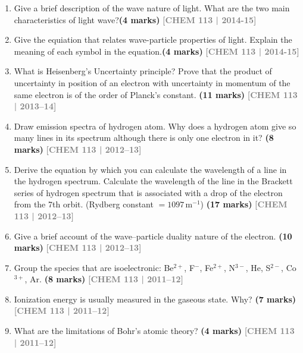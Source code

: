 \documentclass[12pt,a3paper]{article}
\newcommand{\yr}[1]{\hfill\textcolor{gray}{\small\textbf{[#1]}}}
\newcommand{\mk}[1]{\textcolor{orange!70!black}{\small\textbf{(#1 marks)}}}
\begin{document}
\begin{enumerate}
\item Give a brief description of the wave nature of light. What are the two main characteristics of light wave?\mk{4}
\yr{CHEM 113 | 2014-15}



\item Give the equiation that relates wave-particle properties of light. Explain the meaning of each symbol in the equation.\mk{4}
\yr{CHEM 113 | 2014-15}



\item What is Heisenberg's Uncertainty principle? Prove that the product of uncertainty in position of an electron with uncertainty in momentum of the same electron is of the order of Planck's constant. \mk{11}
\yr{CHEM 113 | 2013--14}



\item Draw emission spectra of hydrogen atom. Why does a hydrogen atom give so many lines in its spectrum although there is only one electron in it? \mk{8}
\yr{CHEM 113 | 2012--13}



\item Derive the equation by which you can calculate the wavelength of a line in the hydrogen spectrum. Calculate the wavelength of the line in the Brackett series of hydrogen spectrum that is associated with a drop of the electron from the 7th orbit. (Rydberg constant $= 1097\,\text{m}^{-1}$) \mk{17}
\yr{CHEM 113 | 2012--13}



\item Give a brief account of the wave--particle duality nature of the electron. \mk{10}
\yr{CHEM 113 | 2012--13}




\item Group the species that are isoelectronic: Be$^{2+}$, F$^-$, Fe$^{2+}$, N$^{3-}$, He, S$^{2-}$, Co$^{3+}$, Ar. \mk{8}
\yr{CHEM 113 | 2011--12}



\item Ionization energy is usually measured in the gaseous state. Why? \mk{7}
\yr{CHEM 113 | 2011--12}



\item What are the limitations of Bohr's atomic theory? \mk{4}
\yr{CHEM 113 | 2011--12}




\end{enumerate}
\end{document}
